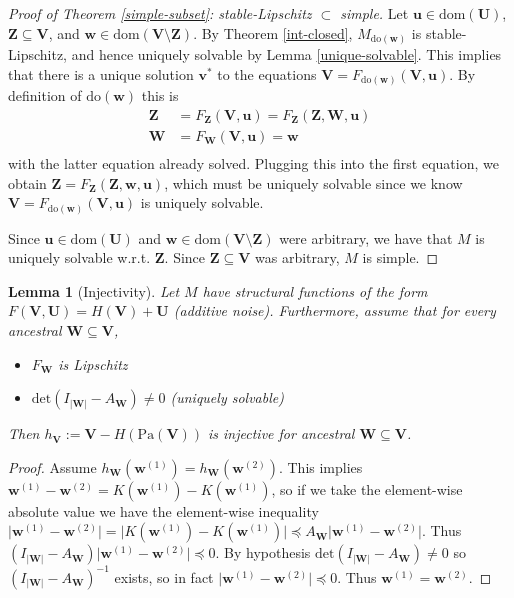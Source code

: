 \documentclass[letterpaper,10pt]{article}
\newtheorem{lemma}[theorem]{Lemma}
\begin{document}
\begin{proof}[Proof of Theorem \ref{simple-subset}: stable-Lipschitz $\subset$ simple]
Let $\mathbf{u}\in\text{dom}(\mathbf{U})$, $\mathbf{Z}\subseteq\mathbf{V}$, and $\mathbf{w}\in\text{dom}(\mathbf{V}\setminus\mathbf{Z})$.
By Theorem \ref{int-closed}, $M_{\text{do}(\mathbf{w})}$ is stable-Lipschitz, and hence uniquely solvable by Lemma \ref{unique-solvable}.
This implies that there is a unique solution $\mathbf{v}^*$ to the equations $\mathbf{V}=F_{\text{do}(\mathbf{w})}(\mathbf{V},\mathbf{u})$.
By definition of $\text{do}(\mathbf{w})$ this is
\begin{align*}
\mathbf{Z} &= F_{\mathbf{Z}}(\mathbf{V},\mathbf{u}) = F_{\mathbf{Z}}(\mathbf{Z},\mathbf{W},\mathbf{u}) \\
\mathbf{W} &= F_{\mathbf{W}}(\mathbf{V},\mathbf{u}) = \mathbf{w} \\
\end{align*}
with the latter equation already solved.
Plugging this into the first equation, we obtain $\mathbf{Z} = F_{\mathbf{Z}}(\mathbf{Z},\mathbf{w},\mathbf{u})$, which must be uniquely solvable since we know $\mathbf{V}=F_{\text{do}(\mathbf{w})}(\mathbf{V},\mathbf{u})$ is uniquely solvable.

Since $\mathbf{u}\in\text{dom}(\mathbf{U})$ and $\mathbf{w}\in\text{dom}(\mathbf{V}\setminus\mathbf{Z})$ were arbitrary, we have that $M$ is uniquely solvable w.r.t. $\mathbf{Z}$.
Since $\mathbf{Z}\subseteq\mathbf{V}$ was arbitrary, $M$ is simple.
\end{proof}

\begin{lemma}[Injectivity] \label{injective}
Let $M$ have structural functions of the form $F(\mathbf{V},\mathbf{U})=H(\mathbf{V})+\mathbf{U}$ (additive noise). Furthermore, assume that for every ancestral $\mathbf{W}\subseteq \mathbf{V}$, 
\begin{itemize}
  \item $F_{\mathbf{W}}$ is Lipschitz
  \item $\text{det}(I_{|\mathbf{W}|}-A_\mathbf{W})\neq 0$ (uniquely solvable)
\end{itemize}
Then $h_\mathbf{V}:=\mathbf{V}-H(\text{Pa}(\mathbf{V}))$ is injective for ancestral $\mathbf{W}\subseteq\mathbf{V}$.
\end{lemma}

\begin{proof}
Assume $h_\mathbf{W}(\mathbf{w}^{(1)})=h_\mathbf{W}(\mathbf{w}^{(2)})$. This implies $\mathbf{w}^{(1)}-\mathbf{w}^{(2)} = K(\mathbf{w}^{(1)}) - K(\mathbf{w}^{(1)})$, so if we take the element-wise absolute value we have the element-wise inequality $\lvert\mathbf{w}^{(1)}-\mathbf{w}^{(2)}\rvert = \lvert K(\mathbf{w}^{(1)}) - K(\mathbf{w}^{(1)})\rvert\preceq A_\mathbf{W} \lvert\mathbf{w}^{(1)}-\mathbf{w}^{(2)}\rvert$. Thus $(I_{|\mathbf{W}|}-A_\mathbf{W})\lvert\mathbf{w}^{(1)}-\mathbf{w}^{(2)}\rvert\preceq 0$. By hypothesis $\text{det}(I_{|\mathbf{W}|}-A_\mathbf{W})\neq 0$ so $(I_{|\mathbf{W}|}-A_\mathbf{W})^{-1}$ exists, so in fact $\lvert\mathbf{w}^{(1)}-\mathbf{w}^{(2)}\rvert\preceq 0$. Thus $\mathbf{w}^{(1)}=\mathbf{w}^{(2)}$.
\end{proof}
\end{document}
